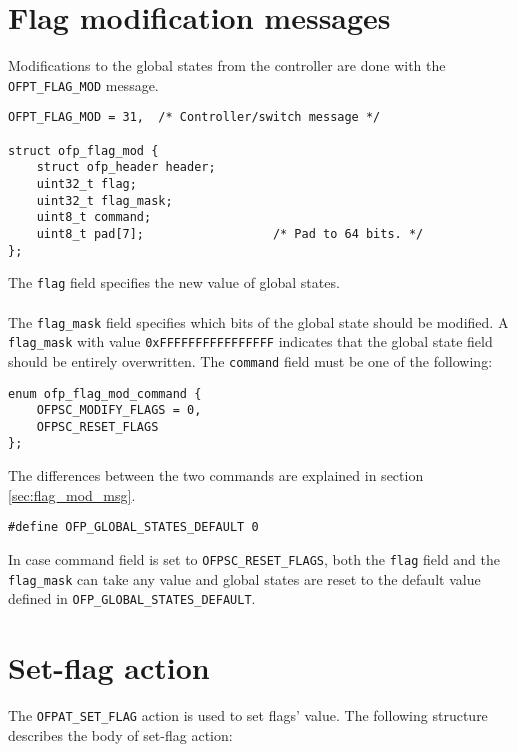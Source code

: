 \section{Flag modification messages}
\label{sec:flag_mod_msg_proto}
Modifications to the global states from the controller are done with the \texttt{OFPT\_FLAG\_MOD} message.

\scriptsize\begin{verbatim}
OFPT_FLAG_MOD = 31,  /* Controller/switch message */

struct ofp_flag_mod {
    struct ofp_header header;
    uint32_t flag;
    uint32_t flag_mask;
    uint8_t command;
    uint8_t pad[7];                  /* Pad to 64 bits. */
};
\end{verbatim}\normalsize

\noindent
The \texttt{flag} field specifies the new value of global states.
\\\\The \texttt{flag\_mask} field specifies which bits of the global state should be modified. A \texttt{flag\_mask} with value \texttt{0xFFFFFFFFFFFFFFFF} indicates that the global state field should be entirely overwritten.
The \texttt{command} field must be one of the following:

\scriptsize\begin{verbatim}
enum ofp_flag_mod_command { 
    OFPSC_MODIFY_FLAGS = 0,
    OFPSC_RESET_FLAGS
};
\end{verbatim}\normalsize
\noindent
The differences between the two commands are explained in section \ref{sec:flag_mod_msg}.

\scriptsize\begin{verbatim}
#define OFP_GLOBAL_STATES_DEFAULT 0
\end{verbatim}\normalsize
\noindent
In case command field is set to \texttt{OFPSC\_RESET\_FLAGS}, both the \texttt{flag} field and the \texttt{flag\_mask} can take any value and global states are reset to the default value defined in \texttt{OFP\_GLOBAL\_STATES\_DEFAULT}.




\section{Set-flag action}
\label{sec:set_flag_action_proto}
The \texttt{OFPAT\_SET\_FLAG} action is used to set flags' value.
The following structure describes the body of set-flag action:

